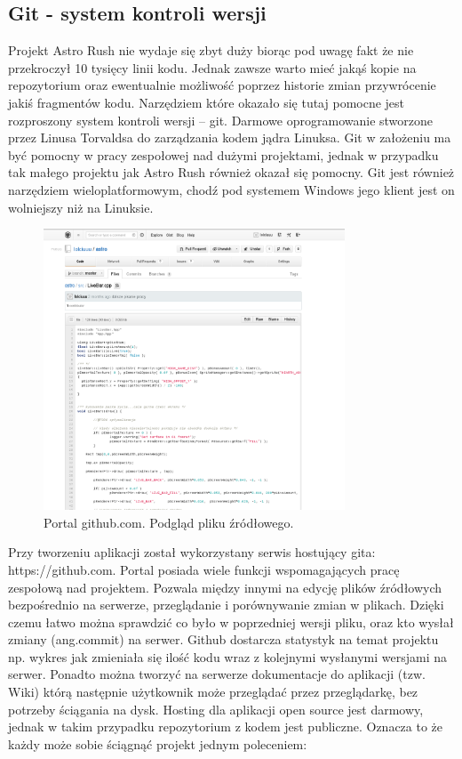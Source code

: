 \subsection{Git - system kontroli wersji}

Projekt Astro Rush nie wydaje się zbyt duży biorąc pod uwagę fakt że nie przekroczył 10 tysięcy linii kodu. Jednak zawsze warto mieć jakąś kopie na repozytorium oraz ewentualnie możliwość poprzez historie  zmian przywrócenie jakiś fragmentów kodu. Narzędziem które okazało się tutaj pomocne jest rozproszony system kontroli wersji – git. Darmowe oprogramowanie stworzone przez Linusa Torvaldsa do zarządzania kodem jądra Linuksa. Git w założeniu ma być pomocny w pracy zespołowej nad dużymi projektami, jednak w przypadku tak małego projektu jak Astro Rush również okazał się pomocny. Git jest również narzędziem wieloplatformowym, chodź pod systemem Windows jego klient jest on wolniejszy niż na Linuksie.

\begin{figure}[h]
    \centering
    \includegraphics[width=0.8\textwidth,natwidth=490,natheight=142]{./Pictures/git.png}
    \caption{Portal github.com. Podgląd pliku źródłowego. }
\end{figure}

Przy tworzeniu aplikacji został wykorzystany serwis hostujący gita: https://github.com. Portal posiada wiele funkcji wspomagających pracę zespołową nad projektem. Pozwala między innymi na edycję plików źródłowych bezpośrednio na serwerze, przeglądanie i porównywanie zmian w plikach. Dzięki czemu łatwo można sprawdzić co było w poprzedniej wersji pliku, oraz kto wysłał zmiany (ang.commit) na serwer. Github dostarcza statystyk na temat projektu np. wykres jak zmieniała się ilość kodu wraz z kolejnymi wysłanymi wersjami na serwer. Ponadto można tworzyć na serwerze dokumentacje do aplikacji (tzw. Wiki) którą następnie użytkownik może przeglądać przez przeglądarkę, bez potrzeby ściągania na dysk. Hosting dla aplikacji open source jest darmowy, jednak w takim przypadku repozytorium z kodem jest publiczne. Oznacza to że każdy może sobie ściągnąć projekt jednym poleceniem:

